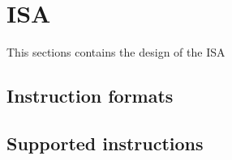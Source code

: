 \section{ISA} \label{fpga:isa:s:isa}



This sections contains the design of the ISA

\subsection{Instruction formats}\label{fpga:isa:ss:instruction_formats}

\subsection{Supported instructions} \label{fpga:isa:ss:supported_instructions}